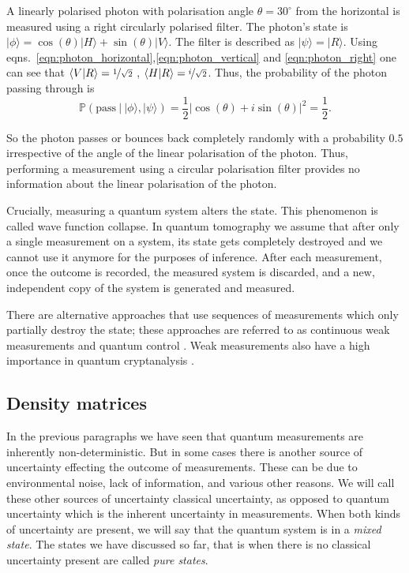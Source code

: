 \begin{example}
A linearly polarised photon with polarisation angle $\theta = 30^{\circ}$ from the horizontal is measured using a right circularly polarised filter. The photon's state is $\vert\phi\rangle = \cos(\theta)\vert H \rangle + \sin(\theta)\vert V \rangle$. The filter is described as $\vert\psi\rangle = \vert R \rangle$. Using eqns.\ \eqref{eqn:photon_horizontal},\eqref{eqn:photon_vertical} and \eqref{eqn:photon_right} one can see that $\langle V \vert R \rangle = \nicefrac{1}{\sqrt{2}}$ , $\langle H \vert R \rangle = \nicefrac{i}{\sqrt{2}}$. Thus, the probability of the photon passing through is
\begin{equation}
	\mathbb{P}\left( \mbox{pass}\ \vert\ \vert\phi\rangle , \vert\psi\rangle \right) = \frac{1}{2}\left\vert\cos(\theta) + i\sin(\theta)\right\vert^2 = \frac{1}{2}.
\end{equation}

So the photon passes or bounces back completely randomly with a probability $0.5$ irrespective of the angle of the linear polarisation of the photon. Thus, performing a measurement using a circular polarisation filter provides no information about the linear polarisation of the photon.
\end{example}

Crucially, measuring a quantum system alters the state.	This phenomenon is called wave function collapse. In quantum tomography we assume that after only a single measurement on a system, its state gets completely destroyed and we cannot use it anymore for the purposes of inference. After each measurement, once the outcome is recorded, the measured system is discarded, and a new, independent copy of the system is generated and measured.

There are alternative approaches that use sequences of measurements which only partially destroy the state; these approaches are referred to as continuous weak measurements and quantum control \citep{Smith2006}. Weak measurements also have a high importance in quantum cryptanalysis \citep{Pryde2004}.

\subsection{Density matrices}

In the previous paragraphs we have seen that quantum measurements are inherently non-deterministic. But in some cases there is another source of uncertainty effecting the outcome of measurements. These can be due to environmental noise, lack of information, and various other reasons. We will call these other sources of uncertainty classical uncertainty, as opposed to quantum uncertainty which is the inherent uncertainty in measurements. When both kinds of uncertainty are present, we will say that the quantum system is in a \emph{mixed state}. The states we have discussed so far, that is when there is no classical uncertainty present are called \emph{pure states}.

